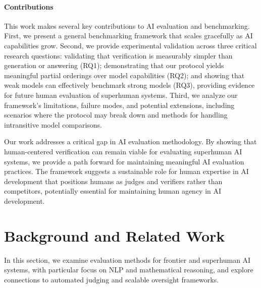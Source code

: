 \documentclass{article} %
\begin{document}
\paragraph{Contributions}
This work makes several key contributions to AI evaluation and benchmarking. First, we present a general benchmarking framework that scales gracefully as AI capabilities grow.
Second, we provide experimental validation across three critical research questions: validating that verification is measurably simpler than generation or answering (RQ1); demonstrating that our protocol yields meaningful partial orderings over model capabilities (RQ2); and showing that weak models can effectively benchmark strong models (RQ3), providing evidence for future human evaluation of superhuman systems.
Third, we analyze our framework's limitations, failure modes, and potential extensions, including scenarios where the protocol may break down and methods for handling intransitive model comparisons.

Our work addresses a critical gap in AI evaluation methodology. By showing that human-centered verification can remain viable for evaluating superhuman AI systems, we provide a path forward for maintaining meaningful AI evaluation practices. The framework suggests a sustainable role for human expertise in AI development that positions humans as judges and verifiers rather than competitors, potentially essential for maintaining human agency in AI development.

\section{Background and Related Work}

In this section, we examine evaluation methods for frontier and superhuman AI systems, with particular focus on NLP and mathematical reasoning, and explore connections to automated judging and scalable oversight frameworks.
\end{document}
